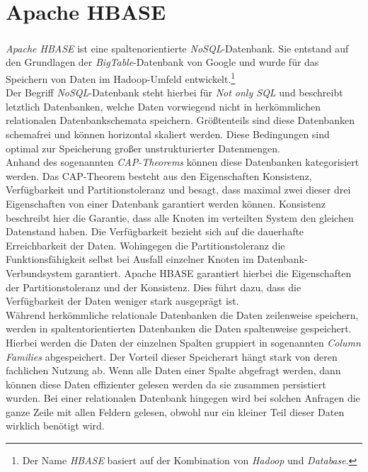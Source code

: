\section{Apache HBASE}
\label{sec:theory_hbase}
\textit{Apache HBASE\textsuperscript{\textregistered}} ist eine spaltenorientierte \textit{NoSQL}-Datenbank. Sie entstand auf den Grundlagen der \textit{BigTable}-Datenbank von Google und wurde für das Speichern von Daten im Hadoop-Umfeld entwickelt.\footnote{Der Name \textit{HBASE} basiert auf der Kombination von \textit{Hadoop} und \textit{Database}.}\\
Der Begriff \textit{NoSQL}-Datenbank steht hierbei für \textit{Not only SQL} und beschreibt letztlich Datenbanken, welche Daten vorwiegend nicht in herkömmlichen relationalen Datenbankschemata speichern. Größtenteils sind diese Datenbanken schemafrei und können horizontal skaliert werden. Diese Bedingungen sind optimal zur Speicherung großer unstrukturierter Datenmengen.\\
Anhand des sogenannten \textit{CAP-Theorems} können diese Datenbanken kategorisiert werden.
Das CAP-Theorem besteht aus den Eigenschaften Konsistenz, Verfügbarkeit und Partitionstoleranz und besagt, dass maximal zwei dieser drei Eigenschaften von einer Datenbank garantiert werden können. Konsistenz beschreibt hier die Garantie, dass alle Knoten im verteilten System den gleichen Datenstand haben. Die Verfügbarkeit bezieht sich auf die dauerhafte Erreichbarkeit der Daten. Wohingegen die Partitionstoleranz die Funktionsfähigkeit selbst bei Ausfall einzelner Knoten im Datenbank-Verbundsystem garantiert.
Apache HBASE garantiert hierbei die Eigenschaften der Partitionstoleranz und der Konsistenz. Dies führt dazu, dass die Verfügbarkeit der Daten weniger stark ausgeprägt ist.
\cite[S. 189 ff.]{big_data_praxis}\\

\noindent
Während herkömmliche relationale Datenbanken die Daten zeilenweise speichern, werden in spaltentorientierten Datenbanken die Daten spaltenweise gespeichert. Hierbei werden die Daten der einzelnen Spalten gruppiert in sogenannten \textit{Column Families} abgespeichert. Der Vorteil dieser Speicherart hängt stark von deren fachlichen Nutzung ab. Wenn alle Daten einer Spalte abgefragt werden, dann können diese Daten effizienter gelesen werden da sie zusammen persistiert wurden. Bei einer relationalen Datenbank hingegen wird bei solchen Anfragen die ganze Zeile mit allen Feldern gelesen, obwohl nur ein kleiner Teil dieser Daten wirklich benötigt wird.\\


